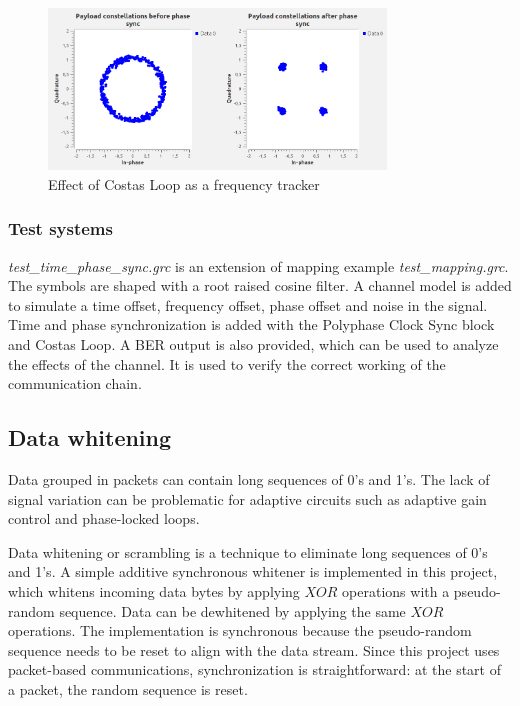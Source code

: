 \begin{figure}[H]
    \centering
    \includegraphics[width=0.8\textwidth]{img_commchain/phase_sync2.png}
    \caption{Effect of Costas Loop as a frequency tracker}
    \label{fig:costas_freq}
\end{figure}

\subsubsection{Test systems}
\textit{test\_time\_phase\_sync.grc} is an extension of mapping example \textit{test\_mapping.grc}. The symbols are shaped with a root raised cosine filter. A channel model is added to simulate a time offset, frequency offset, phase offset and noise in the signal. Time and phase synchronization is added with the Polyphase Clock Sync block and Costas Loop. A BER output is also provided, which can be used to analyze the effects of the channel. It is used to verify the correct working of the communication chain.





\subsection{Data whitening}

Data grouped in packets can contain long sequences of 0's and 1's. The lack of signal variation can be problematic for adaptive circuits such as adaptive gain control and phase-locked loops.\medskip

Data whitening or scrambling is a technique to eliminate long sequences of 0's and 1's. A simple additive synchronous whitener is implemented in this project, which whitens incoming data bytes by applying $XOR$ operations with a pseudo-random sequence. Data can be dewhitened by applying the same $XOR$ operations. The implementation is synchronous because the pseudo-random sequence needs to be reset to align with the data stream. Since this project uses packet-based communications, synchronization is straightforward: at the start of a packet, the random sequence is reset.\medskip

